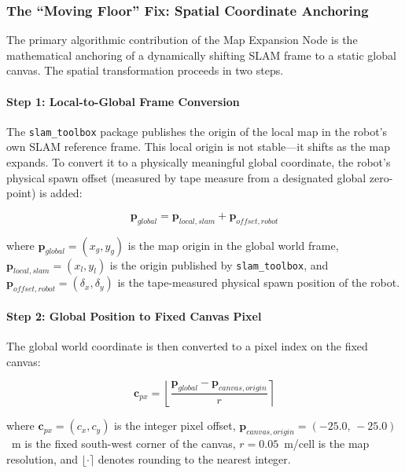 \documentclass{article}
\begin{document}
\subsubsection{The ``Moving Floor'' Fix: Spatial Coordinate Anchoring}
\label{subsubsec:spatial_math}

The primary algorithmic contribution of the Map Expansion Node is the mathematical anchoring of a dynamically shifting SLAM frame to a static global canvas. The spatial transformation proceeds in two steps.

\paragraph{Step 1: Local-to-Global Frame Conversion}
The \texttt{slam\_toolbox} package publishes the origin of the local map in the robot's own SLAM reference frame. This local origin is not stable—it shifts as the map expands. To convert it to a physically meaningful global coordinate, the robot's physical spawn offset (measured by tape measure from a designated global zero-point) is added:

\begin{equation}
    \mathbf{p}_{global} = \mathbf{p}_{local,slam} + \mathbf{p}_{offset,robot}
    \label{eq:global_origin}
\end{equation}

where $\mathbf{p}_{global} = (x_{g}, y_{g})$ is the map origin in the global world frame, $\mathbf{p}_{local,slam} = (x_{l}, y_{l})$ is the origin published by \texttt{slam\_toolbox}, and $\mathbf{p}_{offset,robot} = (\delta_x, \delta_y)$ is the tape-measured physical spawn position of the robot.

\paragraph{Step 2: Global Position to Fixed Canvas Pixel}
The global world coordinate is then converted to a pixel index on the fixed canvas:

\begin{equation}
    \mathbf{c}_{px} = \left\lfloor \frac{\mathbf{p}_{global} - \mathbf{p}_{canvas,origin}}{r} \right\rceil
    \label{eq:canvas_offset}
\end{equation}

where $\mathbf{c}_{px} = (c_x, c_y)$ is the integer pixel offset, $\mathbf{p}_{canvas,origin} = (-25.0,\, -25.0)$~m is the fixed south-west corner of the canvas, $r = 0.05$~m/cell is the map resolution, and $\lfloor \cdot \rceil$ denotes rounding to the nearest integer.
\end{document}
